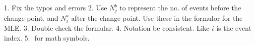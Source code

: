 \documentclass[12pt]{article}
\begin{document}
1. Fix the typos and errors
2. Use $N_j^b$ to represent the no. of events before the change-point, and $N_j^a$ after the change-point. Use these in the formulor for the MLE. 
3. Double check the formular. 
4. Notation be consistent. Like $i$ is the event index. 
5. $$ for math symbols. 
\end{document}
